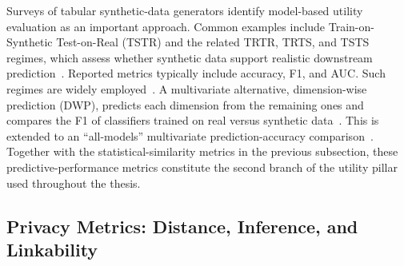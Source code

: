 Surveys of tabular synthetic-data generators identify model-based utility
evaluation as an important approach. Common examples include
Train-on-Synthetic Test-on-Real (TSTR) and the related TRTR, TRTS, and
TSTS regimes, which assess whether synthetic data support realistic
downstream prediction~\cite{hernandez2022synthetic}. Reported metrics typically include
accuracy, F1, and AUC. Such regimes are widely
employed~\cite{wang2019continuous,yang2019grouped,park2018data,beaulieu2019privacy}.
A multivariate alternative, dimension-wise prediction (DWP), predicts each
dimension from the remaining ones and compares the F1 of classifiers trained on
real versus synthetic data~\cite{Choi2017MedGAN}. This is extended to an
``all-models'' multivariate prediction-accuracy
comparison~\cite{emam2021optimizing}. Together with the statistical-similarity
metrics in the previous subsection, these predictive-performance metrics
constitute the second branch of the utility pillar used throughout the thesis.

\subsection{Privacy Metrics: Distance, Inference, and Linkability}
\label{sec:bg:eval:privacy}

